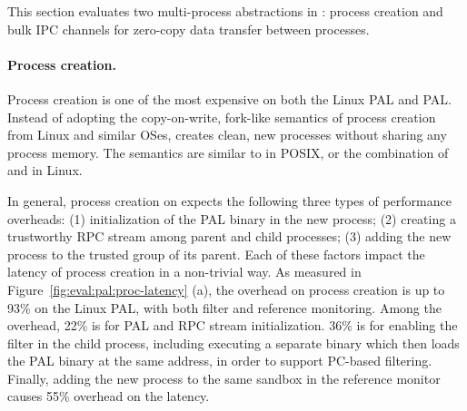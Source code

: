 \label{sec:eval:pal:multi-proc}

This section evaluates two multi-process abstractions in \thehostabi:
process creation and bulk IPC channels for zero-copy data transfer between processes.



\paragraph{Process creation.}
Process creation is one of the most expensive
\hostapis{} on both the Linux PAL and \sgx{} PAL.
Instead of adopting the copy-on-write, fork-like semantics
of process creation
from Linux and similar OSes,
\thehostabi{}
creates clean, new processes
without sharing
any process memory.
The semantics
are similar to  in POSIX, or the combination
of  and  in Linux.



In general, process creation on \thehostabi{}
expects the following three types of performance overheads:
(1) initialization of the PAL binary in the new process;
(2) creating a trustworthy RPC stream among parent and child processes;
(3) adding the new process to the trusted group of its parent.
Each of these factors
impact the latency of process creation
in a non-trivial way.
As measured in
Figure~\ref{fig:eval:pal:proc-latency} (a),
the overhead on process creation
is up to 93\% on the Linux PAL,
with both \seccomp{} filter and reference monitoring.
Among the overhead,
22\% is for PAL and RPC stream initialization.
36\% is for enabling the \seccomp{} filter
in the child process,
including executing a separate binary
which then loads the PAL binary at the same address,
in order to
support PC-based filtering.
Finally,
adding the new process to the same sandbox
in the reference monitor
causes 55\% overhead on the latency.






